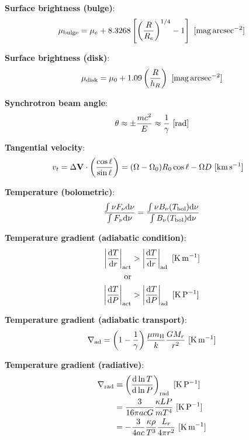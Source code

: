 \documentclass[a4paper,10pt]{article}
\begin{document}
{\noindent}\textbf{Surface brightness (bulge)}:
\begin{align*}
    \mu_\mathrm{bulge} = \mu_e + 8.3268\left[\left(\frac{R}{R_e}\right)^{1/4}-1\right] ~ [{\rm mag\,arcsec^{-2}}]
\end{align*}

{\noindent}\textbf{Surface brightness (disk)}:
\begin{align*}
    \mu_\mathrm{disk} = \mu_0 + 1.09\left(\frac{R}{h_R}\right) ~ {\rm [mag\,arcsec^{-2}}]
\end{align*}

{\noindent}\textbf{Synchrotron beam angle}:
\begin{align*}
    \theta \approx \pm \frac{mc^2}{E} \approx \frac{1}{\gamma} ~ [{\rm rad}]
\end{align*}

{\noindent}\textbf{Tangential velocity}:
\begin{align*}
    v_t &= \Delta\mathbf{V}\cdot\left(\frac{\cos\ell}{\sin\ell}\right) = (\Omega-\Omega_0)R_0\cos\ell - \Omega D ~ [{\rm km\,s^{-1}}]
\end{align*}

{\noindent}\textbf{Temperature (bolometric)}:
\begin{align*}
    \frac{\int\nu F_\nu {\rm d}\nu}{\int F_\nu {\rm d}\nu} = \frac{\int\nu B_\nu(T_{\rm bol}){\rm d}\nu}{\int B_\nu(T_{\rm bol}){\rm d}\nu}
\end{align*}

{\noindent}\textbf{Temperature gradient (adiabatic condition)}:
\begin{align*}
    \left\lvert\frac{{\rm d}T}{{\rm d}r}\right\rvert_{\rm act} &> \left\lvert\frac{{\rm d}T}{{\rm d}r}\right\rvert_{\rm ad} ~ [{\rm K\,m^{-1}}] \\
    {\rm or} \\
    \left\lvert\frac{{\rm d}T}{{\rm d}P}\right\rvert_{\rm act} &> \left\lvert\frac{{\rm d}T}{{\rm d}P}\right\rvert_{\rm ad} ~ [{\rm K\,P^{-1}}]
\end{align*}

{\noindent}\textbf{Temperature gradient (adiabatic transport)}:
\begin{align*}
    \nabla_{\rm ad} = \left(1-\frac{1}{\gamma}\right) \frac{\mu m_{\rm H}}{k}\frac{GM_r}{r^2} ~ [{\rm K\,m^{-1}}]
\end{align*}

{\noindent}\textbf{Temperature gradient (radiative)}:
\begin{align*}
    \nabla_{\rm rad} &\equiv \left(\frac{{\rm d}\ln T}{{\rm d}\ln P}\right)_{\rm rad} ~ [{\rm K\,P^{-1}}] \\
    &= \frac{3}{16\pi acG}\frac{\kappa LP}{mT^4} ~ [{\rm K\,P^{-1}}] \\
    &= -\frac{3}{4ac}\frac{\kappa\rho}{T^3}\frac{L_r}{4\pi r^2} ~ [{\rm K\,m^{-1}}]
\end{align*}
\end{document}
